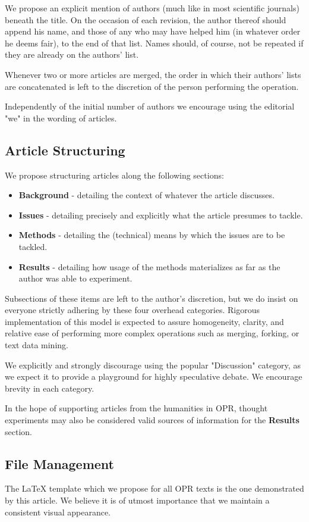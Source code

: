 We propose an explicit mention of authors (much like in most scientific journals) beneath the title.
On the occasion of each revision, the author thereof should append his name, and those of any who may have helped him (in whatever order he deems fair), to the end of that list.
Names should, of course, not be repeated if they are already on the authors' list.

Whenever two or more articles are merged, the order in which their authors' lists are concatenated is left to the discretion of the person performing the operation. 

Independently of the initial number of authors we encourage using the editorial "we" in the wording of articles.
\subsection{Article Structuring}
We propose structuring articles along the following sections:
\begin{itemize}
	\item\textbf{Background} - detailing the context of whatever the article discusses.
	\item\textbf{Issues} - detailing precisely and explicitly what the article presumes to tackle.
	\item\textbf{Methods} - detailing the (technical) means by which the issues are to be tackled.
	\item\textbf{Results} - detailing how usage of the methods materializes as far as the author was able to experiment.
\end{itemize}
Subsections of these items are left to the author's discretion, but we do insist on everyone strictly adhering by these four overhead categories.
Rigorous implementation of this model is expected to assure homogeneity, clarity, and relative ease of performing more complex operations such as merging, forking, or text data mining.

We explicitly and strongly discourage using the popular "Discussion" category, as we expect it to provide a playground for highly speculative debate. 
We encourage brevity in each category.

In the hope of supporting articles from the humanities in OPR, thought experiments may also be considered valid sources of information for the \textbf{Results} section.
\subsection{File Management}
The LaTeX template which we propose for all OPR texts is the one demonstrated by this article.
We believe it is of utmost importance that we maintain a consistent visual appearance.

